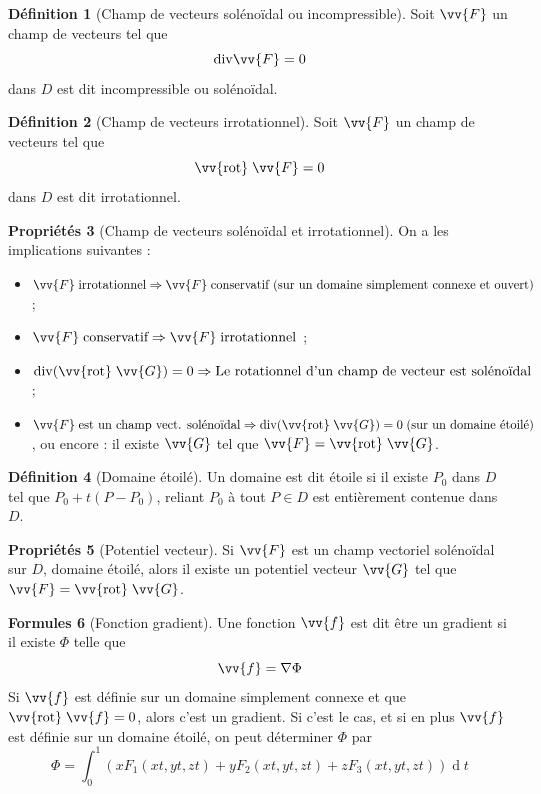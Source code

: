 \documentclass[11pt,a4paper]{article}
\theoremstyle{definition}
\newtheorem{mydef}{Définition}%
\newtheorem{myprop}[mydef]{Propriétés}
\newtheorem{myform}[mydef]{Formules}
\DeclareMathOperator{\diff}{d}
\newcommand{\dif}{\diff\!}
\renewcommand{\div}{\mathrm{div}}
\newcommand{\rot}{\vv{\mathrm{rot}}\;}
\begin{document}
\begin{mydef}[Champ de vecteurs solénoïdal ou incompressible] Soit $\vv{F}$ un champ de vecteurs tel que
	\[ \div \vv{F} = 0 \]
	dans $D$ est dit incompressible ou solénoïdal.
\end{mydef}

\begin{mydef}[Champ de vecteurs irrotationnel] Soit $\vv{F}$ un champ de vecteurs tel que
	\[ \rot \vv{F} = 0 \]
	dans $D$ est dit irrotationnel.
\end{mydef}

\begin{myprop}[Champ de vecteurs solénoïdal et irrotationnel] On a les implications suivantes :
	\begin{itemize}
		\item $ \vv{F} \; \text{irrotationnel} \Rightarrow \vv{F} \; \text{conservatif (sur un domaine simplement connexe et ouvert)} $ ;
		\item $ \vv{F} \;\text{conservatif} \Rightarrow \vv{F} \;\text{irrotationnel} $ ;
		\item $ \div (\rot \vv{G}) = 0  \Rightarrow \text{Le rotationnel d'un champ de vecteur est solénoïdal} $ ;
		\item $ \vv{F} \;\text{est un champ vect. solénoïdal} \Rightarrow \div (\rot \vv{G}) = 0 \;\text{(sur un domaine étoilé)} $, ou encore : il existe $\vv{G}$ tel que $\vv{F} = \rot \vv{G}$.
	\end{itemize}
\end{myprop}

\begin{mydef}[Domaine étoilé]
	Un domaine est dit étoile si il existe $P_0$ dans $D$ tel que $P_0 + t(P - P_0)$, reliant $P_0$ à tout $P \in D$ est entièrement contenue dans $D$.
\end{mydef}

\begin{myprop}[Potentiel vecteur]
	Si $\vv{F}$ est un champ vectoriel solénoïdal sur $D$, domaine étoilé, alors il existe un potentiel vecteur $\vv{G}$ tel que $\vv{F} = \rot \vv{G}$.
\end{myprop}

\begin{myform}[Fonction gradient]
	Une fonction $\vv{f}$ est dit être un gradient si il existe $\Phi$ telle que
	\[ \vv{f} = \nabla \Phi \]
	Si $\vv{f}$ est définie sur un domaine simplement connexe et que $\rot \vv{f} = 0$, alors c'est un gradient.
	Si c'est le cas, et si en plus $\vv{f}$ est définie sur un domaine étoilé, on peut déterminer $\Phi$ par
	\[ \Phi = \int_0^1 \left( x F_1(xt,yt,zt) + y F_2(xt,yt,zt) + z F_3(xt,yt,zt) \right) \dif t \]
\end{myform}
\end{document}
